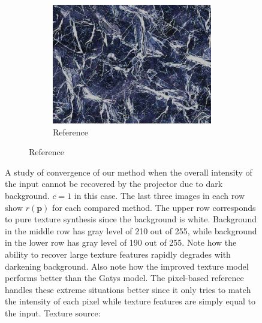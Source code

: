 \begin{figure}[]
\begin{subfigure}{\textwidth}
\begin{subfigure}{0.19\textwidth}
            \centering
            \includegraphics[width=\textwidth]{images/04-experiment02/isolating_issues/190_pixel.jpg}
            \caption*{Reference}
        \end{subfigure}
    \end{subfigure}
    \caption{A study of convergence of our method when the overall intensity of the input cannot be recovered by the projector due to dark background. \(c = 1\) in this case. The last three images in each row show \(r(\bm{p})\) for each compared method. The upper row corresponds to pure texture synthesis since the background is white. Background in the middle row has gray level of 210 out of 255, while background in the lower row has gray level of 190 out of 255. Note how the ability to recover large texture features rapidly degrades with darkening background. Also note how the improved texture model performs better than the Gatys model. The pixel-based reference handles these extreme situations better since it only tries to match the intensity of each pixel while texture features are simply equal to the input. Texture source: \citet{Pixar128}}
    \label{fig:ex02-issues}
\end{figure}

